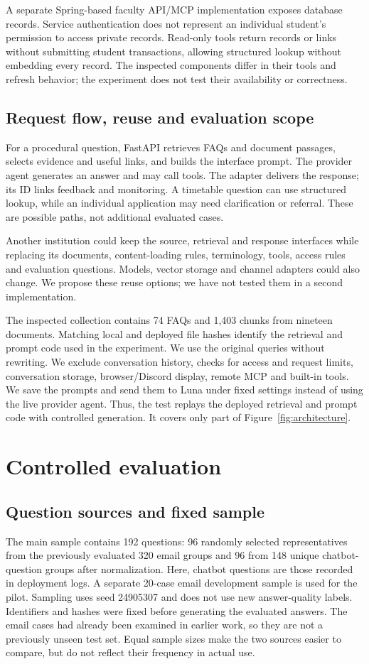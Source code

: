 \documentclass[a4paper,10pt,twocolumn]{article}
\begin{document}
A separate Spring-based faculty API/MCP implementation exposes database records. Service authentication does not represent an individual student's permission to access private records. Read-only tools return records or links without submitting student transactions, allowing structured lookup without embedding every record. The inspected components differ in their tools and refresh behavior; the experiment does not test their availability or correctness.

\subsection{Request flow, reuse and evaluation scope}
For a procedural question, FastAPI retrieves FAQs and document passages, selects evidence and useful links, and builds the interface prompt. The provider agent generates an answer and may call tools. The adapter delivers the response; its ID links feedback and monitoring. A timetable question can use structured lookup, while an individual application may need clarification or referral. These are possible paths, not additional evaluated cases.

Another institution could keep the source, retrieval and response interfaces while replacing its documents, content-loading rules, terminology, tools, access rules and evaluation questions. Models, vector storage and channel adapters could also change. We propose these reuse options; we have not tested them in a second implementation.

The inspected collection contains 74 FAQs and 1,403 chunks from nineteen documents. Matching local and deployed file hashes identify the retrieval and prompt code used in the experiment. We use the original queries without rewriting. We exclude conversation history, checks for access and request limits, conversation storage, browser/Discord display, remote MCP and built-in tools. We save the prompts and send them to Luna under fixed settings instead of using the live provider agent. Thus, the test replays the deployed retrieval and prompt code with controlled generation. It covers only part of Figure~\ref{fig:architecture}.

\section{Controlled evaluation}
\subsection{Question sources and fixed sample}
The main sample contains 192 questions: 96 randomly selected representatives from the previously evaluated 320 email groups and 96 from 148 unique chatbot-question groups after normalization. Here, chatbot questions are those recorded in deployment logs. A separate 20-case email development sample is used for the pilot. Sampling uses seed 24905307 and does not use new answer-quality labels. Identifiers and hashes were fixed before generating the evaluated answers. The email cases had already been examined in earlier work, so they are not a previously unseen test set. Equal sample sizes make the two sources easier to compare, but do not reflect their frequency in actual use.
\end{document}
